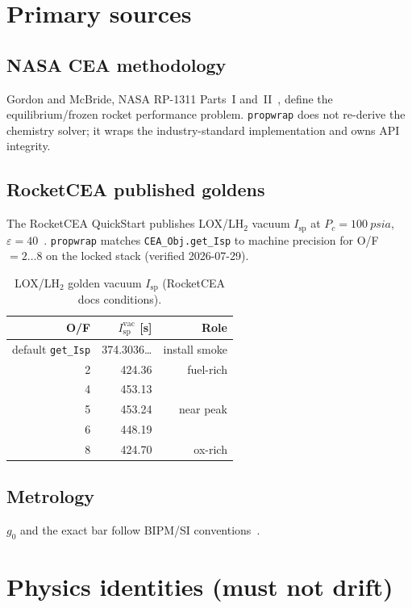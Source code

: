 \documentclass[11pt,a4paper]{report}
\newcommand{\pw}{\texttt{propwrap}}
\newcommand{\Isp}{I_{\mathrm{sp}}}
\newcommand{\Pc}{P_{c}}
\newcommand{\eps}{\varepsilon}
\newcommand{\gzero}{g_{0}}
\begin{document}
\section{Primary sources}

\subsection{NASA CEA methodology}

Gordon and McBride, NASA RP-1311 Parts~I and~II~\citep{gordon1994cea,gordon1996cea},
define the equilibrium/frozen rocket performance problem. \pw{} does not
re-derive the chemistry solver; it wraps the industry-standard implementation
and owns API integrity.

\subsection{RocketCEA published goldens}

The RocketCEA QuickStart publishes LOX/LH$_2$ vacuum $\Isp$ at
$\Pc=\SI{100}{psia}$, $\eps=40$~\citep{rocketcea}. \pw{} matches
\texttt{CEA\_Obj.get\_Isp} to machine precision for O/F~$=2\ldots 8$ on the
locked stack (verified 2026-07-29).

\begin{table}[H]
\centering
\caption{LOX/LH$_2$ golden vacuum $\Isp$ (RocketCEA docs conditions).}
\label{tab:lox_lh2_gold}
\begin{tabular}{@{}rrr@{}}
\toprule
O/F & $\Isp^{\mathrm{vac}}$ [s] & Role \\
\midrule
default \texttt{get\_Isp} & 374.3036\ldots & install smoke \\
2 & 424.36 & fuel-rich \\
4 & 453.13 & \\
5 & 453.24 & near peak \\
6 & 448.19 & \\
8 & 424.70 & ox-rich \\
\bottomrule
\end{tabular}
\end{table}

\subsection{Metrology}

$\gzero$ and the exact bar follow BIPM/SI conventions~\citep{bipm_g0}.

\section{Physics identities (must not drift)}
\end{document}
